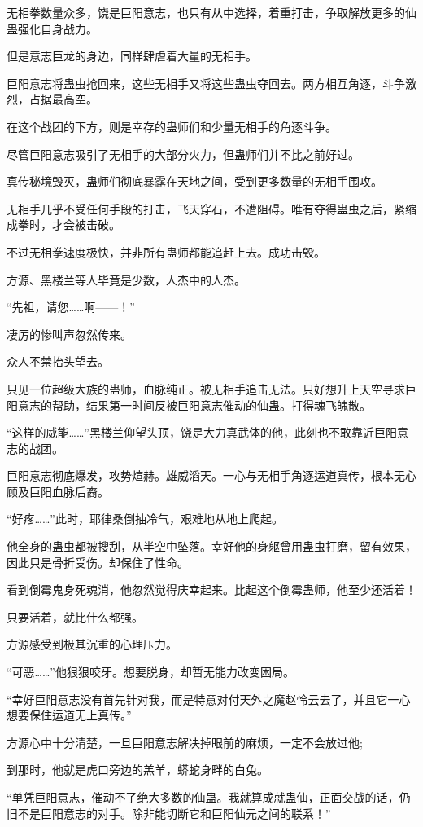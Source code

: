 \begin{this_body}
无相拳数量众多，饶是巨阳意志，也只有从中选择，着重打击，争取解放更多的仙蛊强化自身战力。

但是意志巨龙的身边，同样肆虐着大量的无相手。

巨阳意志将蛊虫抢回来，这些无相手又将这些蛊虫夺回去。两方相互角逐，斗争激烈，占据最高空。

在这个战团的下方，则是幸存的蛊师们和少量无相手的角逐斗争。

尽管巨阳意志吸引了无相手的大部分火力，但蛊师们并不比之前好过。

真传秘境毁灭，蛊师们彻底暴露在天地之间，受到更多数量的无相手围攻。

无相手几乎不受任何手段的打击，飞天穿石，不遭阻碍。唯有夺得蛊虫之后，紧缩成拳时，才会被击破。

不过无相拳速度极快，并非所有蛊师都能追赶上去。成功击毁。

方源、黑楼兰等人毕竟是少数，人杰中的人杰。

“先祖，请您……啊——！”

凄厉的惨叫声忽然传来。

众人不禁抬头望去。

只见一位超级大族的蛊师，血脉纯正。被无相手追击无法。只好想升上天空寻求巨阳意志的帮助，结果第一时间反被巨阳意志催动的仙蛊。打得魂飞魄散。

“这样的威能……”黑楼兰仰望头顶，饶是大力真武体的他，此刻也不敢靠近巨阳意志的战团。

巨阳意志彻底爆发，攻势煊赫。雄威滔天。一心与无相手角逐运道真传，根本无心顾及巨阳血脉后裔。

“好疼……”此时，耶律桑倒抽冷气，艰难地从地上爬起。

他全身的蛊虫都被搜刮，从半空中坠落。幸好他的身躯曾用蛊虫打磨，留有效果，因此只是骨折受伤。却保住了性命。

看到倒霉鬼身死魂消，他忽然觉得庆幸起来。比起这个倒霉蛊师，他至少还活着！

只要活着，就比什么都强。

方源感受到极其沉重的心理压力。

“可恶……”他狠狠咬牙。想要脱身，却暂无能力改变困局。

“幸好巨阳意志没有首先针对我，而是特意对付天外之魔赵怜云去了，并且它一心想要保住运道无上真传。”

方源心中十分清楚，一旦巨阳意志解决掉眼前的麻烦，一定不会放过他;

到那时，他就是虎口旁边的羔羊，蟒蛇身畔的白兔。

“单凭巨阳意志，催动不了绝大多数的仙蛊。我就算成就蛊仙，正面交战的话，仍旧不是巨阳意志的对手。除非能切断它和巨阳仙元之间的联系！”


\end{this_body}
